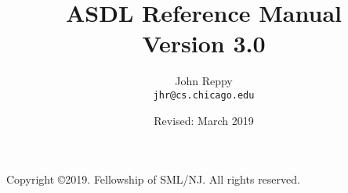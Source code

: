 \documentclass[11pt,letterpaper]{book}
\title{
  ASDL Reference Manual \\
  Version 3.0}
\author{
  John Reppy\\
  \texttt{jhr@cs.chicago.edu}}
\date{Revised: March 2019}
\begin{document}
\frontmatter

\maketitle

\phantom{.}

\noindent Copyright \copyright{}2019.  Fellowship of SML/NJ.  All rights reserved.

\vskip 12pt

\pagebreak

\tableofcontents

\mainmatter


\newpage


%
%




%



\backmatter



\end{document}
